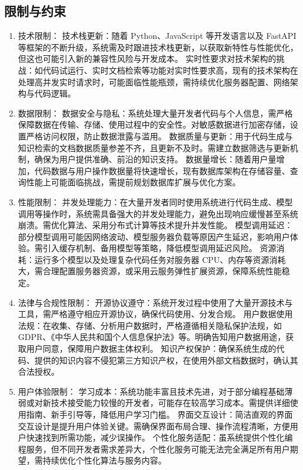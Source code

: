 \documentclass[
    report,     %
    oneside,    %
    UTF8,       %
    zihao=-4    %
]{config} %
\begin{document}
\subsection{限制与约束}
\begin{enumerate}[label=(\arabic*)]
\item 技术限制：
技术栈更新：随着 Python、JavaScript 等开发语言以及 FastAPI 等框架的不断升级，系统需及时跟进技术栈更新，以获取新特性与性能优化，但这也可能引入新的兼容性风险与开发成本。
实时性要求对技术架构的挑战：如代码试运行、实时文档检索等功能对实时性要求高，现有的技术架构在处理高并发实时请求时，可能面临性能瓶颈，需持续优化服务器配置、网络架构与代码逻辑。
\item 数据限制：
数据安全与隐私：系统处理大量开发者代码与个人信息，需严格保障数据在传输、存储、使用过程中的安全性。对敏感数据进行加密存储，设置严格访问权限，防止数据泄露与滥用。
数据质量与更新：用于代码生成与知识检索的文档数据质量参差不齐，且更新不及时。需建立数据筛选与更新机制，确保为用户提供准确、前沿的知识支持。
数据量增长：随着用户量增加，代码数据与用户操作数据量将快速增长，现有数据库架构在存储容量、查询性能上可能面临挑战，需提前规划数据库扩展与优化方案。
\item 性能限制：
并发处理能力：在大量开发者同时使用系统进行代码生成、模型调用等操作时，系统需具备强大的并发处理能力，避免出现响应缓慢甚至系统崩溃。需优化算法、采用分布式计算等技术提升并发性能。
模型调用延迟：部分模型调用可能因网络波动、模型服务器负载等原因产生延迟，影响用户体验。需引入缓存机制、备用模型等策略，降低模型调用延迟风险。
资源消耗：运行多个模型以及处理复杂代码任务对服务器 CPU、内存等资源消耗大，需合理配置服务器资源，或采用云服务弹性扩展资源，保障系统性能稳定。
\item 法律与合规性限制：
开源协议遵守：系统开发过程中使用了大量开源技术与工具，需严格遵守相应开源协议，确保代码使用、分发合规。
用户数据使用法规：在收集、存储、分析用户数据时，严格遵循相关隐私保护法规，如 GDPR、《中华人民共和国个人信息保护法》等。明确告知用户数据用途，获取用户同意，保障用户数据主体权利。
知识产权保护：确保系统生成的代码、提供的知识内容不侵犯第三方知识产权，在使用外部文档数据时，确认其合法授权。
\item 用户体验限制：
学习成本：系统功能丰富且技术先进，对于部分编程基础薄弱或对新技术接受能力较慢的开发者，可能存在较高学习成本。需提供详细使用指南、新手引导等，降低用户学习门槛。
界面交互设计：简洁直观的界面交互设计是提升用户体验关键。需确保界面布局合理、操作流程清晰，方便用户快速找到所需功能，减少误操作。
个性化服务适配：虽系统提供个性化编程服务，但不同开发者需求差异大，个性化服务可能无法完全满足所有用户期望，需持续优化个性化算法与服务内容。
\end{enumerate}
\end{document}
